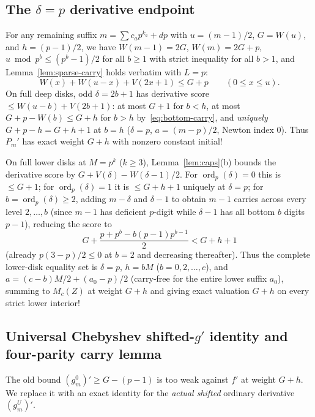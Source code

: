 \documentclass[11pt,reqno]{amsart}
\numberwithin{equation}{section}
\theoremstyle{definition}
\theoremstyle{remark}
\newcommand{\ord}{\operatorname{ord}}
\begin{document}
\subsection{The $\delta=p$ derivative endpoint}

For any remaining suffix $m = \sum c_a p^{k_a} + dp$ with $u=(m-1)/2$, $G=W(u)$, and $h=(p-1)/2$, we have $W(m-1)=2G$, $W(m)=2G+p$, $u\bmod p^b \le (p^b-1)/2$ for all $b\ge 1$ with strict inequality for all $b>1$, and Lemma~\ref{lem:sparse-carry} holds verbatim with $L=p$:
\begin{equation}
\label{eq:bottom-carry}
W(x) + W(u-x) + V(2x+1) \le G + p \qquad (0\le x\le u).
\end{equation}
On full deep disks, odd $\delta=2b+1$ has derivative score $\le W(u-b)+V(2b+1)$: at most $G+1$ for $b<h$, at most $G+p-W(b)\le G+h$ for $b>h$ by~\eqref{eq:bottom-carry}, and \emph{uniquely} $G+p-h = G+h+1$ at $b=h$ ($\delta=p$, $a=(m-p)/2$, Newton index $0$). Thus $P_m'$ has exact weight $G+h$ with nonzero constant initial!

On full lower disks at $M=p^k$ ($k\ge 3$), Lemma~\ref{lem:caps}(b) bounds the derivative score by $G+V(\delta)-W(\delta-1)/2$. For $\ord_p(\delta)=0$ this is $\le G+1$; for $\ord_p(\delta)=1$ it is $\le G+h+1$ uniquely at $\delta=p$; for $b=\ord_p(\delta)\ge 2$, adding $m-\delta$ and $\delta-1$ to obtain $m-1$ carries across every level $2,\ldots,b$ (since $m-1$ has deficient $p$-digit while $\delta-1$ has all bottom $b$ digits $p-1$), reducing the score to
\begin{equation}
\label{eq:high-ord-drop}
G + \frac{p + p^b - b(p-1)p^{b-1}}{2} < G + h + 1
\end{equation}
(already $p(3-p)/2\le 0$ at $b=2$ and decreasing thereafter). Thus the complete lower-disk equality set is $\delta=p$, $h=bM$ ($b=0,2,\ldots,c$), and $a=(c-b)M/2+(a_0-p)/2$ (carry-free for the entire lower suffix $a_0$), summing to $M_c(Z)$ at weight $G+h$ and giving exact valuation $G+h$ on every strict lower interior!

\subsection{Universal Chebyshev shifted-$g'$ identity and four-parity carry lemma}

The old bound $(g_m^0)'\ge G-(p-1)$ is too weak against $f'$ at weight $G+h$. We replace it with an exact identity for the \emph{actual shifted} ordinary derivative $(g_m^U)'$.
\end{document}
